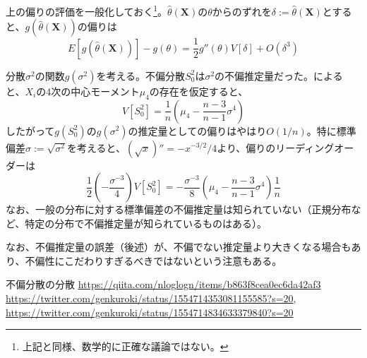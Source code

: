 \documentclass[uplatex,dvipdfmx]{jlreq}
\begin{document}
上の偏りの評価を一般化しておく\footnote{上記と同様、数学的に正確な議論ではない。}。$\hat{\theta}(\boldsymbol{X})$の$\theta$からのずれを$\delta := \hat{\theta}(\boldsymbol{X})$とすると、$g(\hat{\theta}(\boldsymbol{X}))$の偏りは
\begin{equation}
    E[g(\hat{\theta}(\boldsymbol{X}))] - g(\theta)
    = \frac{1}{2}g''(\theta)V[\delta] + O(\delta^3)
\end{equation}

\begin{example}
    分散$\sigma^2$の関数$g(\sigma^2)$を考える。不偏分散$S_0^2$は$\sigma^2$の不偏推定量だった。\cite{u_var_var}によると、$X_i$の4次の中心モーメント$\mu_4$の存在を仮定すると、
    \begin{equation}
        V[S_0^2]
        = \frac{1}{n}\left(\mu_4 - \frac{n-3}{n-1}\sigma^4\right)
    \end{equation}
    したがって$g(S_0^2)$の$g(\sigma^2)$の推定量としての偏りはやはり$O(1/n)$。特に標準偏差$\sigma := \sqrt{\sigma^2}$を考えると、$(\sqrt{x})'' = -x^{-3/2}/4$より、偏りのリーディングオーダーは
    \begin{equation}
        \frac{1}{2}\left(-\frac{\sigma^{-3}}{4}\right)V[S_0^2]
        = -\frac{\sigma^{-3}}{8}
        \left(\mu_4 - \frac{n-3}{n-1}\sigma^4\right)
        \frac{1}{n}
    \end{equation}
    なお、一般の分布に対する標準偏差の不偏推定量は知られていない（正規分布など、特定の分布で不偏推定量が知られているものはある）。
\end{example}

なお、不偏推定量の誤差（後述）が、不偏でない推定量より大きくなる場合もあり、不偏性にこだわりすぎるべきではないという注意もある\cite{kuroki}。

\begin{thebibliography}{9}
     不偏分散の分散 \url{https://qiita.com/nloglogn/items/b863f8cea0ec6da42af3}
     \url{https://twitter.com/genkuroki/status/1554714353081155585?s=20}, \url{https://twitter.com/genkuroki/status/1554714834633379840?s=20}
\end{thebibliography}
\end{document}
